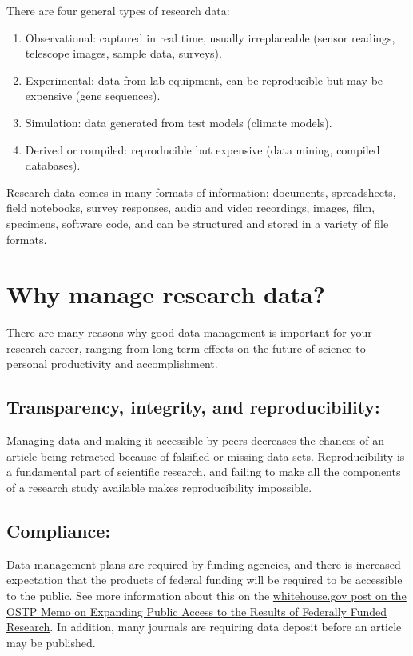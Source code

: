 There are four general types of research data:

\begin{enumerate}
\def\labelenumi{\arabic{enumi}.}
\tightlist
\item
  Observational: captured in real time, usually irreplaceable (sensor
  readings, telescope images, sample data, surveys).
\item
  Experimental: data from lab equipment, can be reproducible but may be
  expensive (gene sequences).
\item
  Simulation: data generated from test models (climate models).
\item
  Derived or compiled: reproducible but expensive (data mining, compiled
  databases).
\end{enumerate}

Research data comes in many formats of information: documents,
spreadsheets, field notebooks, survey responses, audio and video
recordings, images, film, specimens, software code, and can be
structured and stored in a variety of file formats.

\section{Why manage research data?}\label{why-manage-research-data}

There are many reasons why good data management is important for your
research career, ranging from long-term effects on the future of science
to personal productivity and accomplishment.

\subsection{Transparency, integrity, and
reproducibility:}\label{transparency-integrity-and-reproducibility}

Managing data and making it accessible by peers decreases the chances of
an article being retracted because of falsified or missing data sets.
Reproducibility is a fundamental part of scientific research, and
failing to make all the components of a research study available makes
reproducibility impossible.

\subsection{Compliance:}\label{compliance}

Data management plans are required by funding agencies, and there is
increased expectation that the products of federal funding will be
required to be accessible to the public. See more information about this
on the
\href{https://www.whitehouse.gov/blog/2013/02/22/expanding-public-access-results-federally-funded-research}{whitehouse.gov
post on the OSTP Memo on Expanding Public Access to the Results of
Federally Funded Research}. In addition, many journals are requiring
data deposit before an article may be published.

